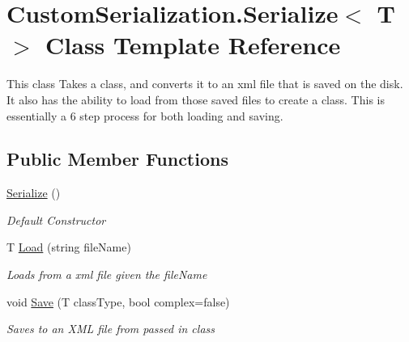 \hypertarget{class_custom_serialization_1_1_serialize_3_01_t_01_4}{\section{Custom\-Serialization.\-Serialize$<$ T $>$ Class Template Reference}
\label{class_custom_serialization_1_1_serialize_3_01_t_01_4}
}


This class Takes a class, and converts it to an xml file that is saved on the disk. It also has the ability to load from those saved files to create a class. This is essentially a 6 step process for both loading and saving.  


\subsection*{Public Member Functions}
\begin{DoxyCompactItemize}
\item 
\hyperlink{class_custom_serialization_1_1_serialize_3_01_t_01_4_a18418aaac4ebc3372de3410626a0ea55}{Serialize} ()
\begin{DoxyCompactList}\small\item\em Default Constructor \end{DoxyCompactList}\item 
T \hyperlink{class_custom_serialization_1_1_serialize_3_01_t_01_4_a8e93c80cca07e34d0a30c4bc53ddfb17}{Load} (string file\-Name)
\begin{DoxyCompactList}\small\item\em Loads from a xml file given the file\-Name \end{DoxyCompactList}\item 
void \hyperlink{class_custom_serialization_1_1_serialize_3_01_t_01_4_af5669ea71316b3920351b64193d47d79}{Save} (T class\-Type, bool complex=false)
\begin{DoxyCompactList}\small\item\em Saves to an X\-M\-L file from passed in class \end{DoxyCompactList}\end{DoxyCompactItemize}
